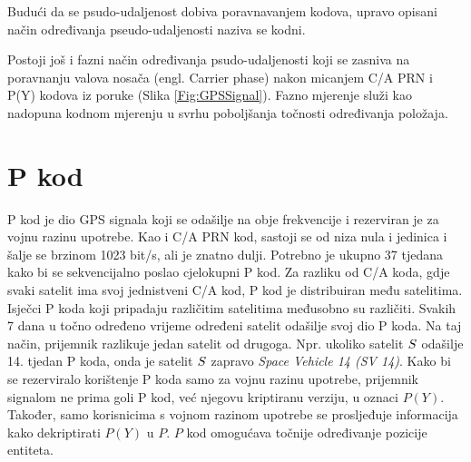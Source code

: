 \documentclass[a4paper,twoside,12pt]{memoir} %
\begin{document}
	Budući da se psudo-udaljenost dobiva poravnavanjem kodova\label{stranica:kodno},
	upravo opisani način određivanja pseudo-udaljenosti naziva se kodni.
	
	Postoji još i fazni način određivanja psudo-udaljenosti koji se zasniva na poravnanju valova nosača (engl. Carrier phase) nakon micanjem C/A PRN i P(Y) kodova  iz poruke (Slika \ref{Fig:GPSSignal}).
	Fazno mjerenje služi kao nadopuna kodnom mjerenju u svrhu poboljšanja točnosti određivanja položaja.
	
	
	\section{P kod}\label{Pkod}
	P kod je dio GPS signala koji se odašilje na obje frekvencije i rezerviran je za vojnu razinu upotrebe.
	Kao i C/A PRN kod, sastoji se od niza nula i jedinica i šalje se brzinom 1023 bit/s, ali je znatno dulji.
	Potrebno je ukupno 37 tjedana kako bi se sekvencijalno poslao cjelokupni P kod.
	Za razliku od C/A koda, gdje svaki satelit ima svoj jednistveni C/A kod, P kod je
	distribuiran među satelitima. Isječci P koda koji pripadaju različitim satelitima međusobno su različiti.
	Svakih 7 dana u točno određeno vrijeme određeni satelit odašilje svoj dio P koda.
	Na taj način, prijemnik razlikuje jedan satelit od drugoga. Npr. ukoliko
	satelit $\mathnormal{S}$ odašilje 14. tjedan P koda, onda je satelit $\mathnormal{S}$
	zapravo \textit{Space Vehicle 14 (SV 14)}.
	Kako bi se rezerviralo korištenje P koda samo za vojnu razinu upotrebe,
	prijemnik signalom ne prima goli P kod, već njegovu kriptiranu verziju, u oznaci $P(Y)$.
	Također, samo korisnicima s vojnom razinom upotrebe se prosljeđuje informacija kako dekriptirati $P(Y)$ u $P$.
	$P$ kod omogućava točnije određivanje pozicije entiteta.
	
\end{document}

